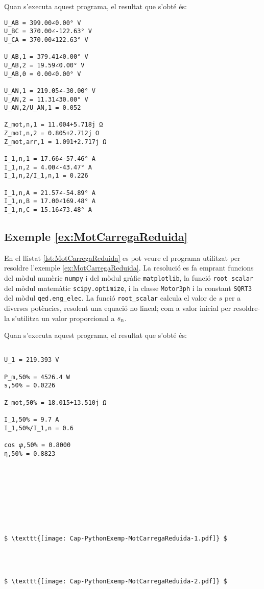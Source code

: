 Quan s'executa aquest programa, el resultat que s'obté és:
\lstset{
	language=,
	numbers=none,
	frame=none
}
\begin{lstlisting}
U_AB = 399.00∠0.00° V
U_BC = 370.00∠-122.63° V
U_CA = 370.00∠122.63° V

U_AB,1 = 379.41∠0.00° V
U_AB,2 = 19.59∠0.00° V
U_AB,0 = 0.00∠0.00° V

U_AN,1 = 219.05∠-30.00° V
U_AN,2 = 11.31∠30.00° V
U_AN,2/U_AN,1 = 0.052

Z_mot,n,1 = 11.004+5.718j Ω
Z_mot,n,2 = 0.805+2.712j Ω
Z_mot,arr,1 = 1.091+2.717j Ω

I_1,n,1 = 17.66∠-57.46° A
I_1,n,2 = 4.00∠-43.47° A
I_1,n,2/I_1,n,1 = 0.226

I_1,n,A = 21.57∠-54.89° A
I_1,n,B = 17.00∠169.48° A
I_1,n,C = 15.16∠73.48° A
\end{lstlisting} 


\hypertarget{exemple:MotCarregaReduida}{\subsection{Exemple \ref*{ex:MotCarregaReduida} \MotCarregaReduida}}
En el llistat \vref{lst:MotCarregaReduida} es pot veure el programa utilitzat per resoldre l'exemple \vref{ex:MotCarregaReduida}. La resolució es fa emprant funcions del mòdul numèric \texttt{numpy} i del mòdul gràfic \texttt{matplotlib}, la funció \texttt{root\_scalar} del mòdul matemàtic \texttt{scipy.optimize}, i la classe \texttt{Motor3ph}  i la constant  \texttt{SQRT3} del mòdul \texttt{qed.eng\_elec}. La funció \texttt{root\_scalar} calcula el valor de $s$ per a diverses potències, resolent una equació no lineal; com a valor inicial per resoldre-la  s'utilitza un valor proporcional a $s_\mathrm{n}$.


Quan s'executa aquest programa, el resultat que s'obté és:
\lstset{
	language=,
	numbers=none,
	frame=none
}
\begin{lstlisting}[mathescape=true]
	
U_1 = 219.393 V

P_m,50% = 4526.4 W
s,50% = 0.0226

Z_mot,50% = 18.015+13.510j Ω

I_1,50% = 9.7 A
I_1,50%/I_1,n = 0.6

cos 𝜑,50% = 0.8000
η,50% = 0.8823









$ \texttt{[image: Cap-PythonExemp-MotCarregaReduida-1.pdf]} $




$ \texttt{[image: Cap-PythonExemp-MotCarregaReduida-2.pdf]} $
\end{lstlisting} 


